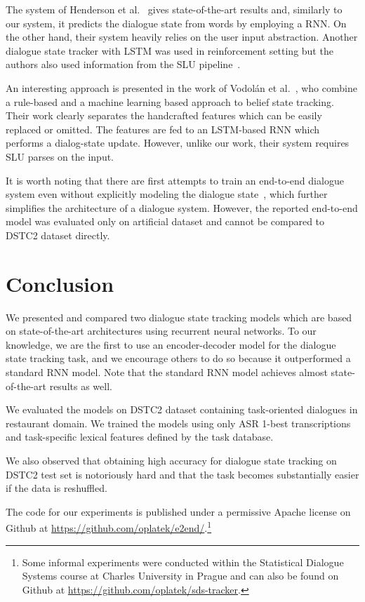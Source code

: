 \documentclass{itatnew}
\begin{document}
The system of Henderson et al.~\cite{henderson2014word} gives state-of-the-art results and, similarly to our system, it predicts the dialogue state from words by employing a RNN.
On the other hand, their system heavily relies on the user input abstraction.
Another dialogue state tracker with LSTM was used in reinforcement setting but the authors also used information from the SLU pipeline~\cite{lee2016dialog}.

An interesting approach is presented in the work of Vodolán et al.~\cite{vodolan2015hybrid}, who combine a rule-based and a machine learning based approach to belief state tracking.
Their work clearly separates the handcrafted features which can be easily replaced or omitted.
The features are fed to an LSTM-based RNN which performs a dialog-state update.
However, unlike our work, their system requires SLU parses on the input.

It is worth noting that there are first attempts to train an end-to-end dialogue system even without explicitly modeling the dialogue state~\cite{bordes2016learning}, which further simplifies the architecture of a dialogue system.
However, the reported end-to-end model was evaluated only on artificial dataset and cannot be compared to DSTC2 dataset directly.

\section{Conclusion}
\label{sec:conc}

We presented and compared two dialogue state tracking models which are based on state-of-the-art architectures using recurrent neural networks.
To our knowledge, we are the first to use an encoder-decoder model for the dialogue state tracking task, and we encourage others to do so because it outperformed a standard RNN model. 
Note that the standard RNN model achieves almost state-of-the-art results as well.

We evaluated the models on DSTC2 dataset containing task-oriented dialogues in restaurant domain. 
We trained the models using only ASR 1-best transcriptions and task-specific lexical features defined by the task database.

We also observed that obtaining high accuracy for dialogue state tracking on DSTC2 test set is notoriously hard and that the task becomes substantially easier if the data is reshuffled.

The code for our experiments is published under a permissive Apache license on Github at \url{https://github.com/oplatek/e2end/}.\footnote{Some informal experiments were conducted  within the Statistical Dialogue Systems course at Charles University in Prague and can also be  found on Github at \url{https://github.com/oplatek/sds-tracker}.}
\end{document}
